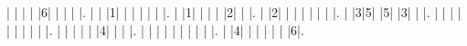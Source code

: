 \begin{sudoku-block}
| | | | |6| | | | |.
| | |1| | | | | | |.
| |1| | | | |2| | |.
| |2| | | | | | | |.
| |3|5| |5| |3| | |.
| | | | | | | | | |.
| | | | | |4| | | |.
| | | | | | | | | |.
| |4| | | | | | |6|.
\end{sudoku-block}